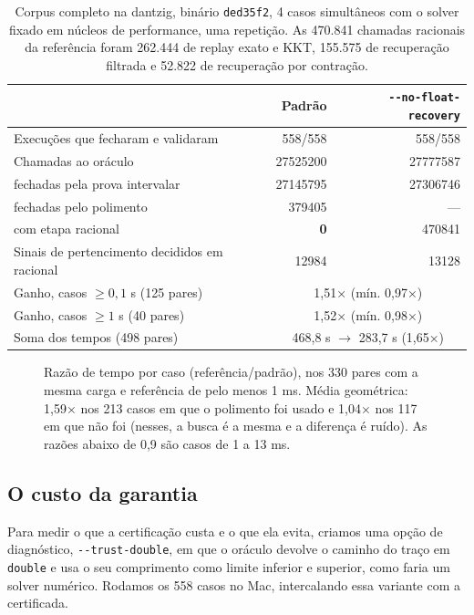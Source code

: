 \documentclass[11pt,a4paper]{article}
\theoremstyle{plain}\newtheorem{proposicao}{Proposição}
\theoremstyle{definition}\newtheorem{definicao}{Definição}
\theoremstyle{plain}\newtheorem{teorema}{Teorema}
\newcommand{\code}[1]{\texttt{\small #1}}
\begin{document}
\begin{table}[ht]\centering\small
\begin{tabular}{@{}lrr@{}}\toprule
& Padrão & \code{-{}-no-float-recovery}\\\midrule
Execuções que fecharam e validaram & 558/558 & 558/558\\
Chamadas ao oráculo & \num{27525200} & \num{27777587}\\
\quad fechadas pela prova intervalar & \num{27145795} & \num{27306746}\\
\quad fechadas pelo polimento & \num{379405} & ---\\
\quad com etapa racional & \textbf{0} & \num{470841}\\
Sinais de pertencimento decididos em racional & \num{12984} & \num{13128}\\\midrule
Ganho, casos \(\ge0{,}1\) s (125 pares) & \multicolumn{2}{c}{1,51× (mín. 0,97×)}\\
Ganho, casos \(\ge1\) s (40 pares) & \multicolumn{2}{c}{1,52× (mín. 0,98×)}\\
Soma dos tempos (498 pares) & \multicolumn{2}{c}{468,8 s \(\to\) 283,7 s (1,65×)}\\\bottomrule
\end{tabular}
\caption{Corpus completo na dantzig, binário \code{ded35f2}, 4 casos simultâneos com o solver fixado em núcleos de performance, uma repetição. As 470.841 chamadas racionais da referência foram 262.444 de replay exato e KKT, 155.575 de recuperação filtrada e 52.822 de recuperação por contração.}\label{tab:dantzig}
\end{table}

\begin{figure}[ht]\centering\figdispersao
\caption{Razão de tempo por caso (referência/padrão), nos 330 pares com a mesma carga e referência de pelo menos 1 ms. Média geométrica: 1,59× nos 213 casos em que o polimento foi usado e 1,04× nos 117 em que não foi (nesses, a busca é a mesma e a diferença é ruído). As razões abaixo de 0,9 são casos de 1 a 13 ms.}\label{fig:dispersao}
\end{figure}

\subsection{O custo da garantia}\label{sec:confiar}
Para medir o que a certificação custa e o que ela evita, criamos uma opção de diagnóstico, \code{-{}-trust-double}, em que o oráculo devolve o caminho do traço em \texttt{double} e usa o seu comprimento como limite inferior e superior, como faria um solver numérico. Rodamos os 558 casos no Mac, intercalando essa variante com a certificada.
\end{document}
